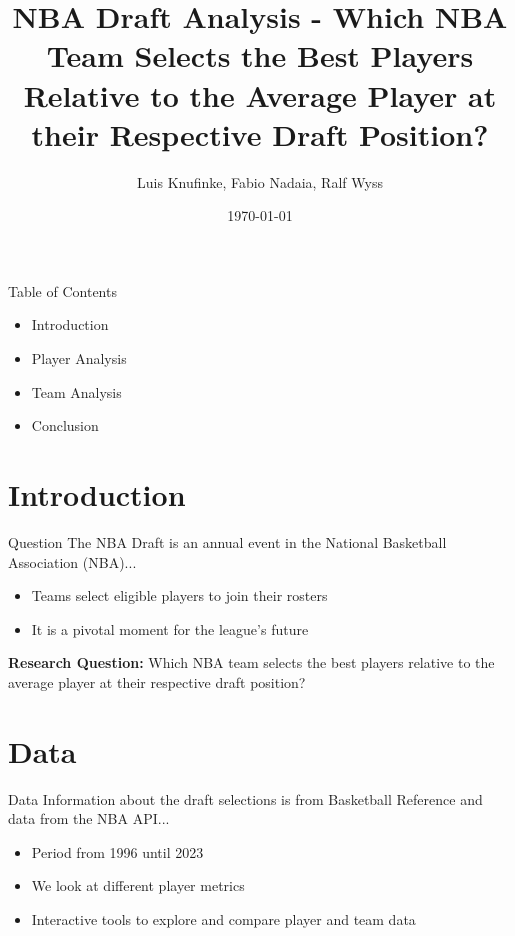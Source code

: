\documentclass{beamer}
\title[NBA Draft Analysis]{NBA Draft Analysis - Which NBA Team Selects the Best Players Relative to the Average Player at their Respective Draft Position?}
\author{Luis Knufinke, Fabio Nadaia, Ralf Wyss}
\institute[Your Institute]{University of Zurich}
\date{\today}
\begin{document}
\begin{frame}
  \titlepage
\end{frame}

\begin{frame}{Table of Contents}
    \begin{itemize}
        \item Introduction
        \item Player Analysis
        \item Team Analysis
        \item Conclusion
      \end{itemize}
\end{frame}

\section{Introduction}
\begin{frame}{Question}
  The NBA Draft is an annual event in the National Basketball Association (NBA)...
  \begin{itemize}
    \item Teams select eligible players to join their rosters
    \item It is a pivotal moment for the league's future
  \end{itemize}
  \vspace{10pt} 
  \textbf{Research Question:} Which NBA team selects the best players relative to the average player at their respective draft position?
\end{frame}

\section{Data}
\begin{frame}{Data}
  Information about the draft selections is from Basketball Reference and data from the NBA API...
  \begin{itemize}
    \item Period from 1996 until 2023
    \item We look at different player metrics
    \item Interactive tools to explore and compare player and team data
  \end{itemize}
\end{frame}
\end{document}
